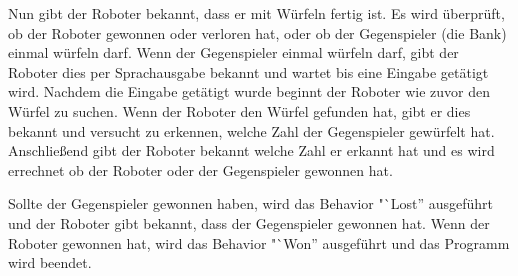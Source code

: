     Nun gibt der Roboter bekannt, dass er mit Würfeln fertig ist.
    Es wird überprüft, ob der Roboter gewonnen oder verloren hat, oder ob der
    Gegenspieler (die Bank) einmal würfeln darf.
    Wenn der Gegenspieler einmal würfeln darf, gibt der Roboter dies per
    Sprachausgabe bekannt und wartet bis eine Eingabe getätigt wird.
    Nachdem die Eingabe getätigt wurde beginnt der Roboter wie zuvor den
    Würfel zu suchen.
    Wenn der Roboter den Würfel gefunden hat, gibt er dies bekannt und versucht
    zu erkennen, welche Zahl der Gegenspieler gewürfelt hat.
    Anschließend gibt der Roboter bekannt welche Zahl er erkannt hat und es wird
    errechnet ob der Roboter oder der Gegenspieler gewonnen hat.

    Sollte der Gegenspieler gewonnen haben, wird das Behavior "`Lost''
    ausgeführt und der Roboter gibt bekannt, dass der Gegenspieler gewonnen hat.
    Wenn der Roboter gewonnen hat, wird das Behavior "`Won'' ausgeführt und
    das Programm wird beendet.
